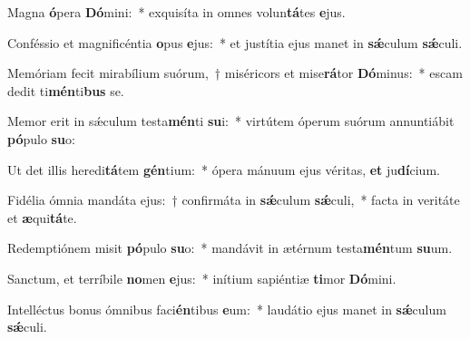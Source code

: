 \item Magna \textbf{ó}pera \textbf{Dó}mini:~* exquisíta in omnes volun\textbf{tá}tes \textbf{e}jus.

\item Conféssio et magnificéntia \textbf{o}pus \textbf{e}jus:~* et justítia ejus manet in \textbf{sǽ}culum \textbf{sǽ}culi.

\item Memóriam fecit mirabílium suórum,~† miséricors et mise\textbf{rá}tor \textbf{Dó}minus:~* escam dedit ti\textbf{mén}ti\textbf{bus} se.

\item Memor erit in sǽculum testa\textbf{mén}ti \textbf{su}i:~* virtútem óperum suórum annuntiábit \textbf{pó}pulo \textbf{su}o:

\item Ut det illis heredi\textbf{tá}tem \textbf{gén}tium:~* ópera mánuum ejus véritas, \textbf{et} ju\textbf{dí}cium.

\item Fidélia ómnia mandáta ejus:~† confirmáta in \textbf{sǽ}culum \textbf{sǽ}culi,~* facta in veritáte et \textbf{æ}qui\textbf{tá}te.

\item Redemptiónem misit \textbf{pó}pulo \textbf{su}o:~* mandávit in ætérnum testa\textbf{mén}tum \textbf{su}um.

\item Sanctum, et terríbile \textbf{no}men \textbf{e}jus:~* inítium sapiéntiæ \textbf{ti}mor \textbf{Dó}mini.

\item Intelléctus bonus ómnibus faci\textbf{én}tibus \textbf{e}um:~* laudátio ejus manet in \textbf{sǽ}culum \textbf{sǽ}culi.
